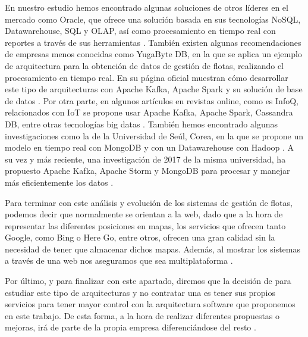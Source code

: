 En nuestro estudio hemos encontrado algunas soluciones de otros
líderes en el mercado como Oracle, que ofrece una solución basada en
sus tecnologías NoSQL, Datawarehouse, SQL y OLAP, así como
procesamiento en tiempo real con reportes a través de sus herramientas
\cite{Oracle}. También existen algunas recomendaciones de empresas
menos conocidas como YugaByte DB, en la que se aplica un ejemplo de
arquitectura para la obtención de datos de gestión de flotas,
realizando el procesamiento en tiempo real. En su página oficial
muestran cómo desarrollar este tipo de arquitecturas con Apache Kafka,
Apache Spark y su solución de base de datos \cite{Yuga}. Por otra
parte, en algunos artículos en revistas online, como es InfoQ,
relacionados con IoT se propone usar Apache Kafka, Apache Spark,
Cassandra DB, entre otras tecnologías big datas \cite{InfoQ}. También
hemos encontrado algunas investigaciones como la de la Universidad de
Seúl, Corea, en la que se propone un modelo en tiempo real con MongoDB
y con un Datawarehouse con Hadoop \cite{NoSQLVehicle}. A su vez y más
reciente, una investigación de 2017 de la misma universidad, ha
propuesto Apache Kafka, Apache Storm y MongoDB para procesar y manejar
más eficientemente los datos \cite{MDPI}.

Para terminar con este análisis y evolución de los sistemas de gestión
de flotas, podemos decir que normalmente se orientan a la web, dado
que a la hora de representar las diferentes posiciones en mapas, los
servicios que ofrecen tanto Google, como Bing o Here Go, entre otros,
ofrecen una gran calidad sin la necesidad de tener que almacenar
dichos mapas. Además, al mostrar los sistemas a través de una web nos
aseguramos que sea multiplataforma \cite{2-1}.

Por último, y para finalizar con este apartado, diremos que la
decisión de \mdata{} para estudiar este tipo de arquitecturas y no
contratar una es tener sus propios servicios para tener mayor control
con la arquitectura software que proponemos en este trabajo. De esta
forma, a la hora de realizar diferentes propuestas o mejoras, irá de
parte de la propia empresa \mdata{} diferenciándose del resto
\cite{2-12}.

